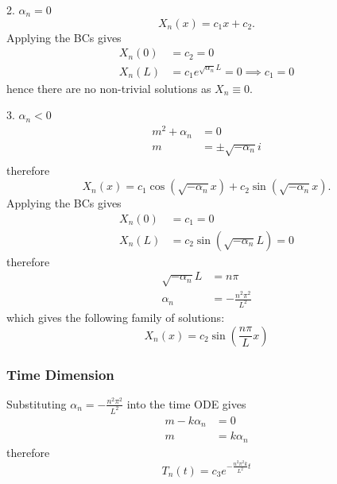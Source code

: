 \documentclass{article}
\begin{document}
\begin{proofcase}{2. \(\alpha_n = 0\)}\let\qed\relax
    \begin{equation*}
        X_n\left( x \right) = c_1 x + c_2.
    \end{equation*}
    Applying the BCs gives
    \begin{align*}
        X_n\left( 0 \right) & = c_2 = 0                                        \\
        X_n\left( L \right) & = c_1 e^{\sqrt{\alpha_n} L} = 0 \implies c_1 = 0
    \end{align*}
    hence there are no non-trivial solutions as \(X_n \equiv 0\).
\end{proofcase}
\begin{proofcase}{3. \(\alpha_n < 0\)}\let\qed\relax
    \begin{align*}
        m^2 + \alpha_n & = 0                      \\
        m              & = \pm \sqrt{-\alpha_n} i \\
    \end{align*}
    therefore
    \begin{equation*}
        X_n\left( x \right) = c_1 \cos{\left( \sqrt{-\alpha_n} x \right)} + c_2 \sin{\left( \sqrt{-\alpha_n} x \right)}.
    \end{equation*}
    Applying the BCs gives
    \begin{align*}
        X_n\left( 0 \right) & = c_1 = 0                                         \\
        X_n\left( L \right) & = c_2 \sin{\left( \sqrt{-\alpha_n} L \right)} = 0
    \end{align*}
    therefore
    \begin{align*}
        \sqrt{-\alpha_n} L & = n \pi                  \\
        \alpha_n           & = -\frac{n^2 \pi^2}{L^2}
    \end{align*}
    which gives the following family of solutions:
    \begin{equation*}
        X_n\left( x \right) = c_2 \sin{\left( \frac{n \pi}{L} x \right)}
    \end{equation*}
\end{proofcase}
\subsubsection{Time Dimension}
Substituting \(\alpha_n = -\frac{n^2 \pi^2}{L^2}\) into the time ODE gives
\begin{align*}
    m - k \alpha_n & = 0          \\
    m              & = k \alpha_n
\end{align*}
therefore
\begin{equation*}
    T_n\left( t \right) = c_3 e^{-\frac{n^2 \pi^2 k}{L^2} t}
\end{equation*}
\end{document}
